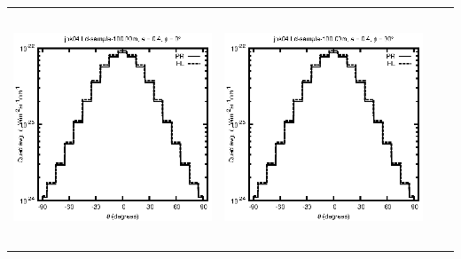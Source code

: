 \documentclass[10pt,a4paper]{article}
\begin{document}
\begin{adjustwidth}{-1.2in}{-1.2in}
\begin{tabular}{c c c c}
\includegraphics[height=7cm]{../eps/jok04_Ld_sample_100.00m_fwd.eps} &
\includegraphics[height=7cm]{../eps/jok04_Ld_sample_100.00m_cross.eps} \\
\end{tabular}

\pagebreak


\end{adjustwidth}
\end{document}
